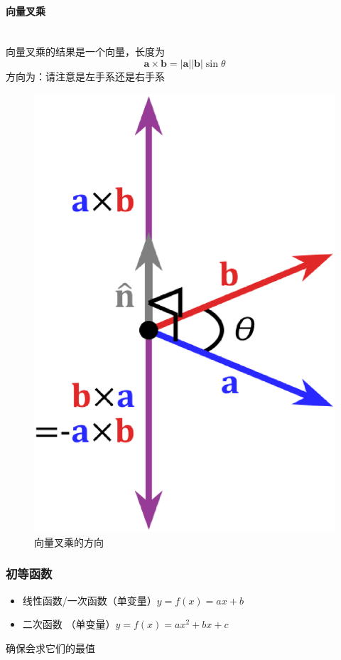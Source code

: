 \documentclass[a4paper, 11pt, oneside]{article}
\newcommand{\bol}[1]{\textbf{#1}}
\begin{document}
\paragraph{向量叉乘}\quad\\
\indent 向量叉乘的结果是一个向量，长度为
\begin{displaymath}
	\bol{a} \times \bol{b} = \vert\bol{a}\vert \vert\bol{b}\vert \sin{\theta}
\end{displaymath}
方向为：请注意是左手系还是右手系
\begin{figure}[!h]
\center
\includegraphics[scale=0.3]{./asset/vector_times.eps}
\caption{向量叉乘的方向}
\end{figure}
\subsubsection{初等函数}
\begin{itemize}
	\item 线性函数/一次函数（单变量）$y = f(x) = ax+b$
	\item 二次函数 （单变量）$y = f(x) = ax^2 + bx + c$
\end{itemize}
确保会求它们的最值
\newpage
\end{document}
